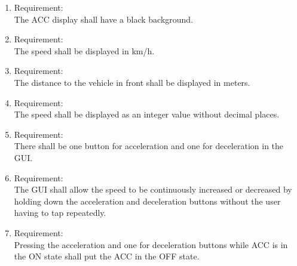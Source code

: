 \begin{enumerate}[label*=\arabic*.]
 	\item \label{req.noss.1}  Requirement: \\
	 	The ACC display shall have a black background.  \\

        \item \label{req.noss.2} Requirement: \\
        The speed shall be displayed in km/h.  \\
	 	\item \label{req.noss.3} Requirement: \\
        The distance to the vehicle in front shall be displayed in meters. \\
        \item \label{req.noss.4} Requirement: \\
        The speed shall be displayed as an integer value without decimal places. \\
        \item \label{req.noss.5} Requirement: \\
        There shall be one button for acceleration and one for deceleration in the GUI. \\
        \item \label{req.noss.6} Requirement: \\
        The GUI shall allow the speed to be continuously increased or decreased by holding down the acceleration and deceleration buttons without the user having to tap repeatedly. \\
        \item \label{req.noss.7} Requirement: \\
        Pressing the acceleration and one for deceleration buttons while ACC is in the ON state shall put the ACC in the OFF state. \\

        
	 \end{enumerate}

